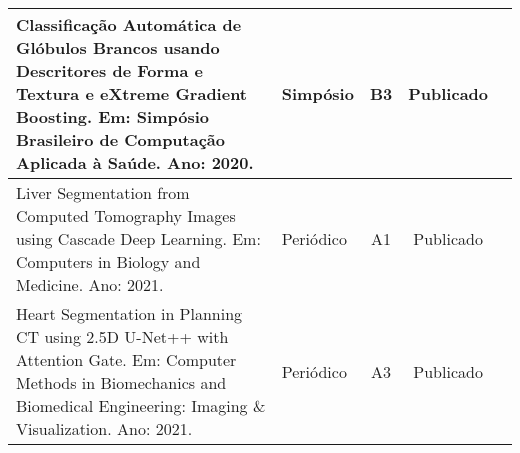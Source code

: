 \begin{table}[ht!]
{\begin{tabular}{p{11cm}lccc}
Classificação Automática de Glóbulos Brancos usando Descritores de Forma e Textura e eXtreme Gradient Boosting. Em: Simpósio Brasileiro de Computação Aplicada à Saúde. Ano: 2020.         & Simpósio      & B3              & Publicado       \\ \hline
Liver Segmentation from Computed Tomography Images using Cascade Deep Learning. Em: Computers in Biology and Medicine. Ano: 2021.                                                           & Periódico     & A1              & Publicado       \\ \hline
Heart Segmentation in Planning CT using 2.5D U-Net++ with Attention Gate. Em: Computer Methods in Biomechanics and Biomedical Engineering: Imaging \& Visualization. Ano: 2021.            & Periódico     & A3              & Publicado       \\ \hline
\end{tabular}
}
\end{table}